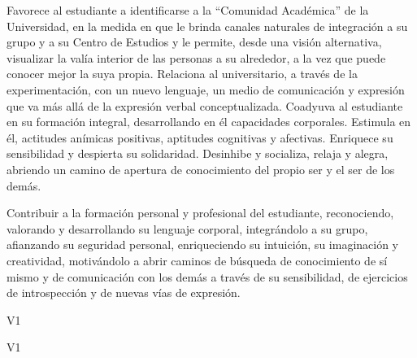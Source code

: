 \begin{syllabus}


\begin{justification}
Favorece al estudiante a identificarse a la ``Comunidad Académica'' de la Universidad, en la medida en que le brinda canales naturales de integración a su grupo y  a su Centro de Estudios y le permite,  desde una visión alternativa, visualizar la valía interior de las personas a su alrededor, a la vez que puede conocer mejor la suya propia.
Relaciona al universitario, a través de la experimentación, con un nuevo lenguaje, un medio de comunicación y expresión que va más allá de la expresión verbal conceptualizada.
Coadyuva al estudiante en su formación integral, desarrollando en él  capacidades corporales. Estimula en él, actitudes anímicas positivas,  aptitudes cognitivas y afectivas. Enriquece su sensibilidad y despierta su solidaridad.
Desinhibe y socializa, relaja y alegra,  abriendo un camino de apertura de conocimiento del propio ser y el ser de los demás.
\end{justification}

\begin{goals}
\item Contribuir a la formación personal y profesional del estudiante, reconociendo, valorando y desarrollando su lenguaje corporal, integrándolo a su grupo, afianzando su seguridad personal, enriqueciendo su intuición, su imaginación y creatividad, motivándolo  a abrir caminos de búsqueda  de conocimiento de sí mismo y de comunicación con los demás a través de su sensibilidad, de ejercicios de introspección y de nuevas vías de expresión.
\end{goals}

\begin{outcomes}{V1}
    \item {}
    \item {}
\end{outcomes}

\begin{competences}{V1}
    \item {}
    \item {}
    \item {}
\end{competences}


\end{syllabus}
